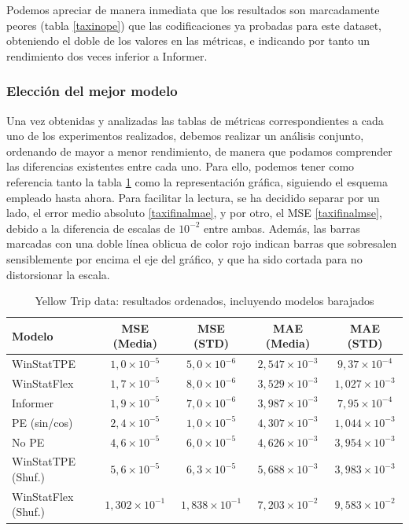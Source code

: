 Podemos apreciar de manera inmediata que los resultados son marcadamente peores (tabla \ref{taxinope}) que las codificaciones ya probadas para este dataset, obteniendo el doble de los valores en las métricas, e indicando por tanto un rendimiento dos veces inferior a Informer.

\subsubsection{Elección del mejor modelo}

Una vez obtenidas y analizadas las tablas de métricas correspondientes a cada uno de los experimentos realizados, debemos realizar un análisis conjunto, ordenando de mayor a menor rendimiento, de manera que podamos comprender las diferencias existentes entre cada uno. Para ello, podemos tener como referencia tanto la tabla \ref{taxifinal} como la representación gráfica, siguiendo el esquema empleado hasta ahora. Para facilitar la lectura, se ha decidido separar por un lado, el error medio absoluto \ref{taxifinalmae}, y por otro, el MSE \ref{taxifinalmse}, debido a la diferencia de escalas de $10^{-2}$ entre ambas. Además, las barras marcadas con una doble línea oblicua de color rojo indican barras que sobresalen sensiblemente por encima el eje del gráfico, y que ha sido cortada para no distorsionar la escala.\\


\begin{table}[!ht]
	\centering
	\begin{tabular}{l|c|c|c|c}
		\toprule
		Modelo & MSE (Media) & MSE (STD) & MAE (Media) & MAE (STD) \\
		\midrule
		WinStatTPE & $1,0 \times 10^{-5}$ & $5,0 \times 10^{-6}$ & $2,547 \times 10^{-3}$ & $9,37 \times 10^{-4}$ \\
		WinStatFlex & $1,7 \times 10^{-5}$ & $8,0 \times 10^{-6}$ & $3,529 \times 10^{-3}$ & $1,027 \times 10^{-3}$ \\
		Informer & $1,9 \times 10^{-5}$ & $7,0 \times 10^{-6}$ & $3,987 \times 10^{-3}$ & $7,95 \times 10^{-4}$ \\
		PE (sin/cos) & $2,4 \times 10^{-5}$ & $1,0 \times 10^{-5}$ & $4,307 \times 10^{-3}$ & $1,044 \times 10^{-3}$ \\
		No PE & $4,6 \times 10^{-5}$ & $6,0 \times 10^{-5}$ & $4,626 \times 10^{-3}$ & $3,954 \times 10^{-3}$ \\
		WinStatTPE (Shuf.) & $5,6 \times 10^{-5}$ & $6,3 \times 10^{-5}$ & $5,688 \times 10^{-3}$ & $3,983 \times 10^{-3}$ \\
		WinStatFlex (Shuf.) & $1,302 \times 10^{-1}$ & $1,838 \times 10^{-1}$ & $7,203 \times 10^{-2}$ & $9,583 \times 10^{-2}$ \\
		\bottomrule
	\end{tabular}
	\caption{Yellow Trip data: resultados ordenados, incluyendo modelos barajados}
	\label{taxifinal}
\end{table}


